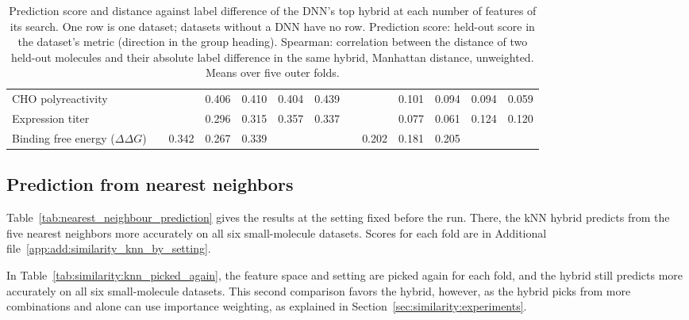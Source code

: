 \begin{table}
\begin{tabular}{@{}lrrrrrrrrrrrr@{}}
CHO polyreactivity &  &  & 0.406 & 0.410 & 0.404 & 0.439 &  &  & 0.101 & 0.094 & 0.094 & 0.059 \\
Expression titer &  &  & 0.296 & 0.315 & 0.357 & 0.337 &  &  & 0.077 & 0.061 & 0.124 & 0.120 \\
Binding free energy ($\Delta\Delta G$) &  & 0.342 & 0.267 & 0.339 &  &  &  & 0.202 & 0.181 & 0.205 &  &  \\
\bottomrule
\end{tabular}
\caption[Prediction score and distance against label difference by number of features]{Prediction score and distance against label difference of the DNN's top hybrid at each number of features of its search. One row is one dataset; datasets without a DNN have no row. Prediction score: held-out score in the dataset's metric (direction in the group heading). Spearman: correlation between the distance of two held-out molecules and their absolute label difference in the same hybrid, Manhattan distance, unweighted. Means over five outer folds.}
\label{tab:similarity:feature_count}
\end{table}


\subsection{Prediction from nearest neighbors}\label{sec:similarity:results_knn}

Table~\ref{tab:nearest_neighbour_prediction} gives the results at the setting fixed before the run. There, the kNN hybrid predicts from the five nearest neighbors more accurately on all six small-molecule datasets. Scores for each fold are in Additional file~\ref{app:add:similarity_knn_by_setting}.



In Table~\ref{tab:similarity:knn_picked_again}, the feature space and setting are picked again for each fold, and the hybrid still predicts more accurately on all six small-molecule datasets. This second comparison favors the hybrid, however, as the hybrid picks from more combinations and alone can use importance weighting, as explained in Section~\ref{sec:similarity:experiments}.

